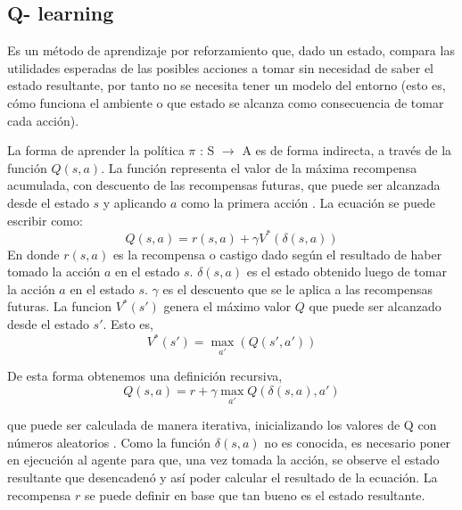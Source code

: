 \subsection{ Q- learning}

Es un método de aprendizaje por reforzamiento que, dado un estado, compara las utilidades esperadas de las posibles acciones a tomar sin necesidad de saber el estado resultante, por tanto no se necesita tener un modelo del entorno\cite{peterNorvig} (esto es, cómo funciona el ambiente o que estado se alcanza como consecuencia de tomar cada acción).

La forma de aprender la política $\pi$ : S $\to$ A es de forma indirecta, a través de la función $Q(s,a)$. La función representa el valor de la máxima recompensa acumulada, con descuento de las recompensas futuras, que puede ser alcanzada desde el estado $s$ y aplicando $a$ como la primera acción \cite{Mitchell}. La ecuación se puede escribir como:
\[Q(s,a) = r(s,a) + \gamma V^*(\delta(s,a))\]
En donde $r(s,a)$ es la recompensa o castigo dado según el resultado de haber tomado la acción $a$ en el estado $s$. $\delta(s,a)$ es el estado obtenido luego de tomar la acción $a$ en el estado $s$. $\gamma$ es el descuento que se le aplica a las recompensas futuras. La funcion $V^*(s')$ genera el máximo valor $Q$ que puede ser alcanzado desde el estado $s'$. Esto es,
\[V^*(s')= \max_{a'} (Q(s',a'))\] 

De esta forma obtenemos una definición recursiva,
\[Q(s,a) = r + \gamma \max_{a'} Q(\delta(s,a),a')\]

que puede ser calculada de manera iterativa, inicializando los valores de Q con números aleatorios \cite{Mitchell}. Como la función $\delta(s,a)$ no es conocida, es necesario poner en ejecución al agente para que, una vez tomada la acción, se observe el estado resultante que desencadenó y así poder calcular el resultado de la ecuación. La recompensa $r$ se puede definir en base que tan bueno es el estado resultante. 


